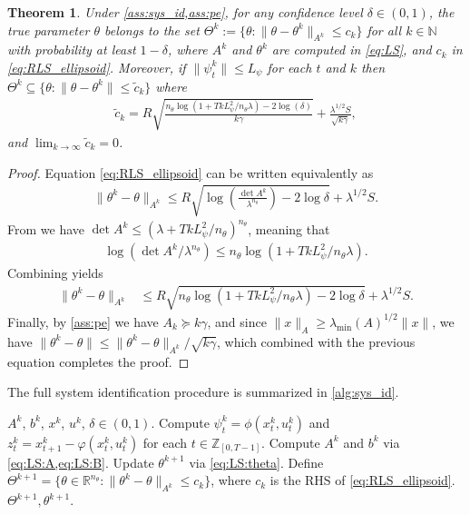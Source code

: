 \documentclass[journal,twoside,web,final]{ieeecolor}
\newtheorem{theorem}{Theorem}
\theoremstyle{definition}
\newcommand{\R}{\mathbb{R}}
\newcommand{\Z}{\mathbb{Z}}
\newcommand{\N}{\mathbb{N}}
\begin{document}
%
\begin{theorem}\label{thm:sys_id}
Under \cref{ass:sys_id,ass:pe}, for any confidence level $\delta\in(0,1)$, the true parameter $\theta$ belongs to the set $\Theta^k:=\{ \theta: \|\theta-\theta^k\|_{A^k} \leq c_k \}$ for all $k\in\N$ with probability at least $1-\delta$, where $A^k$ and $\theta^k$ are computed in \cref{eq:LS}, and $c_k$ in \cref{eq:RLS_ellipsoid}. 
Moreover, if $\|\psi_t^k\|\leq L_\psi$ for each $t$ and $k$ then $\Theta^k \subseteq \{ \theta: \|\theta-\theta^k\| \leq \tilde{c}_k \}$ where
\begin{align}
\tilde{c}_k = R \sqrt { \frac {  n_\theta \log (1+TkL_\psi^2/n_\theta\lambda) - 2\log(\delta) } { k \gamma } } + \frac{\lambda^{1/2}S}{\sqrt{k \gamma} }, \label{eq:c_k}
\end{align}
and $\lim_{k \to \infty} \tilde{c}_k=0$.
\end{theorem}
\begin{proof}
Equation \cref{eq:RLS_ellipsoid} can be written equivalently as
\begin{align*}
\|\theta^k-\theta\|_{A^k} \leq R \sqrt{\log \left( \frac{\det A^k}{ \lambda^{n_\theta} } \right) - 2 \log \delta } + \lambda^{1/2} S.
\end{align*}
From \cite[Lemma 10]{abbasi2011improved} we have $\operatorname*{det}A^k \leq (\lambda + Tk L_\psi^2/n_\theta)^{n_\theta}$, meaning that
\begin{align*}
\log \left( {\det A^k}/{\lambda^{n_\theta}} \right) \leq n_\theta \log \left( 1 + {Tk L_\psi^2}/{n_\theta \lambda} \right).
\end{align*}
Combining yields
\begin{align*}
\|\theta^k-\theta\|_{A^k} & \leq R \sqrt{ n_\theta \log (1+Tk L_\psi^2/n_\theta \lambda) - 2 \log \delta }  + \lambda^{1/2}S.
\end{align*}
Finally, by \cref{ass:pe} we have $A_k \succeq k \gamma$, and since $\|x\|_A \geq \lambda_\text{min}(A)^{1/2}\|x\|$, we have $\|\theta^k-\theta\| \leq \|\theta^k-\theta\|_{A^k} / \sqrt{k \gamma}$, which combined with the previous equation completes the proof.
\end{proof}
%
The full system identification procedure is summarized in \cref{alg:sys_id}.
%
\begin{algorithm}
\caption{System identification.}\label{alg:sys_id}
\begin{algorithmic}[1]
\Input $A^k$, $b^k$, $x^k$, $u^k$, $\delta\in(0,1)$.
\State Compute $\psi_t^k=\phi(x_t^k,u_t^k)$ and $z^k_t=x_{t+1}^k-\varphi(x_t^k,u_t^k)$ for each $t\in\Z_{[0,T-1]}$.
\State Compute $A^k$ and $b^k$ via \cref{eq:LS:A,eq:LS:B}.
\State Update $\theta^{k+1}$ via \cref{eq:LS:theta}.
\State Define $\Theta^{k+1} = \{ \theta\in\R^{n_\theta} : \|\theta^k-\theta\|_{A^k} \leq c_k \}$, where $c_k$ is the RHS of \cref{eq:RLS_ellipsoid}.
\State \Return $\Theta^{k+1},\theta^{k+1}$.
\end{algorithmic}
\end{algorithm}
\end{document}
